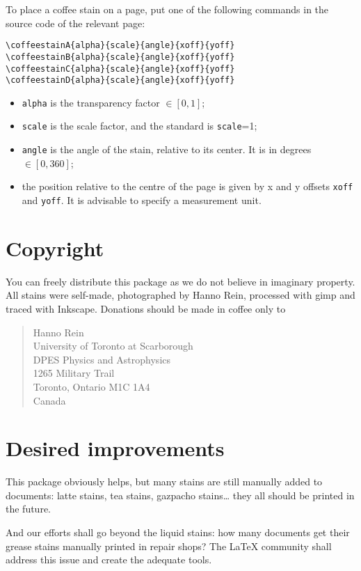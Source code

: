 \documentclass[a4paper, 11pt, BCOR = 0 pt, oneside, english]{scrartcl}
\begin{document}
To place a coffee stain on a page, put one of the following commands in the source code of the relevant page: 
\begin{verbatim}
\coffeestainA{alpha}{scale}{angle}{xoff}{yoff}
\coffeestainB{alpha}{scale}{angle}{xoff}{yoff}
\coffeestainC{alpha}{scale}{angle}{xoff}{yoff}
\coffeestainD{alpha}{scale}{angle}{xoff}{yoff}
\end{verbatim}

\begin{itemize}
\item \texttt{alpha} is the transparency factor $\in [0,1]$;
\item \texttt{scale} is the scale factor, and the standard is \texttt{scale}=1;
\item \texttt{angle} is the angle of the stain, relative to its center. It is in
  degrees $\in [0,360]$;
\item the position relative to the centre of the page is given by x and
  y offsets \texttt{xoff} and \texttt{yoff}. It is advisable to specify
  a measurement unit.
\end{itemize}


\section{Copyright}
You can freely distribute this package as we do not believe in imaginary
property. All stains were self-made, photographed by Hanno Rein, processed with gimp
and traced with Inkscape. Donations should be made in coffee only to
\begin{quote}
Hanno Rein\\
University of Toronto at Scarborough\\
DPES Physics and Astrophysics\\
1265 Military Trail\\
Toronto, Ontario M1C 1A4\\
Canada
\end{quote}

\section{Desired improvements}
This package obviously helps, but many stains are still manually added to
documents: latte stains, tea stains, gazpacho stains\dots{} they all should be
printed in the future.

And our efforts shall go beyond the liquid stains: how many documents get their
grease stains manually printed in repair shops? The \LaTeX{} community shall
address this issue and create the adequate tools.
\end{document}
